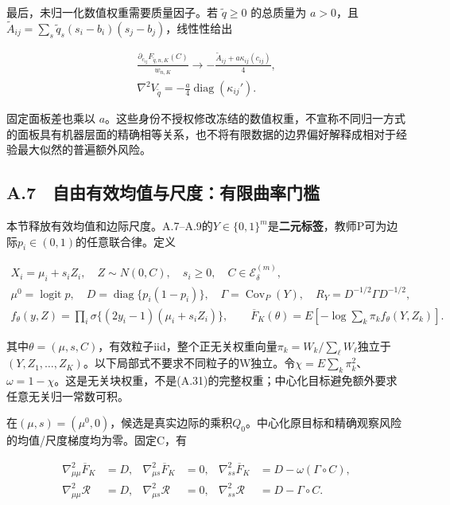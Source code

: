 \documentclass[11pt,a4paper]{article}
\begin{document}
最后，未归一化数值权重需要质量因子。若 \(\widetilde q\ge0\) 的总质量为
\(a>0\)，且
\(\widetilde A_{ij}=\sum_s\widetilde q_s(s_i-b_i)(s_j-b_j)\)，线性性给出

\[
\begin{gathered}
\frac{\partial_{c_{ij}}F_{\widetilde q,n,K}(C)}{w_{n,K}}
\longrightarrow-\frac{\widetilde A_{ij}+a\kappa_{ij}(c_{ij})}{4},\\
\nabla^2V_{\widetilde q}=-\frac a4\operatorname{diag}(\kappa_{ij}').
\end{gathered}
\tag{A.36}
\]

固定面板差也乘以
\(a\)。这些身份不授权修改冻结的数值权重，不宣称不同归一方式的面板具有机器层面的精确相等关系，也不将有限数据的边界偏好解释成相对于经验最大似然的普遍额外风险。

\subsection*{A.7　自由有效均值与尺度：有限曲率门槛}\label{a.7-ux81eaux7531ux6709ux6548ux5747ux503cux4e0eux5c3aux5ea6ux6709ux9650ux66f2ux7387ux95e8ux69db}

本节释放有效均值和边际尺度。A.7--A.9的\(Y\in\{0,1\}^m\)是\textbf{二元标签}，教师P可为边际\(p_i\in(0,1)\)的任意联合律。定义

\[
\begin{gathered}
X_i=\mu_i+s_iZ_i,\quad Z\sim N(0,C),\quad s_i\ge0,\quad C\in\mathcal E_\delta^{(m)},\\
\mu^0=\operatorname{logit}p,\quad D=\operatorname{diag}\{p_i(1-p_i)\},\quad
\Gamma=\operatorname{Cov}_P(Y),\quad R_Y=D^{-1/2}\Gamma D^{-1/2},\\
f_\theta(y,Z)=\prod_i\sigma\{(2y_i-1)(\mu_i+s_iZ_i)\},\qquad
\overline F_K(\theta)=E[-\log\sum_k\pi_k f_\theta(Y,Z_k)].
\end{gathered}
\tag{A.37}
\]

其中\(\theta=(\mu,s,C)\)，有效粒子iid，整个正无关权重向量\(\pi_k=W_k/\sum_\ell W_\ell\)独立于\((Y,Z_1,\ldots,Z_K)\)。以下局部式不要求不同粒子的W独立。令\(\chi=E\sum_k\pi_k^2\)、\(\omega=1-\chi\)。这是无关块权重，不是(A.31)的完整权重；中心化目标避免额外要求任意无关归一常数可积。

在\((\mu,s)=(\mu^0,0)\)，候选是真实边际的乘积\(Q_0\)。中心化原目标和精确观察风险的均值/尺度梯度均为零。固定C，有

\[
\begin{aligned}
\nabla^2_{\mu\mu}\overline F_K&=D,&\nabla^2_{\mu s}\overline F_K&=0,&
\nabla^2_{ss}\overline F_K&=D-\omega(\Gamma\circ C),\\
\nabla^2_{\mu\mu}\mathcal R&=D,&\nabla^2_{\mu s}\mathcal R&=0,&
\nabla^2_{ss}\mathcal R&=D-\Gamma\circ C.
\end{aligned}
\tag{A.38}
\]
\end{document}
